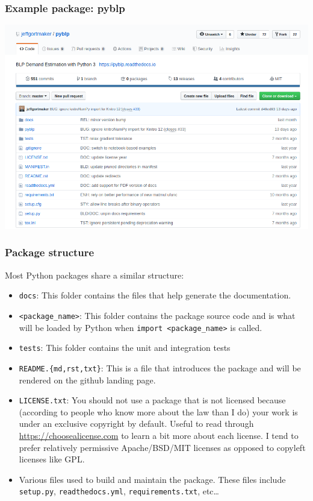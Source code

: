 \documentclass[10pt]{beamer}
\begin{document}
  \begin{frame} \frametitle{Example package: pyblp}

    \begin{center}
      \includegraphics[width=\textwidth]{pyblp_gh_snapshot.png}
    \end{center}


  \end{frame}

  \begin{frame} \frametitle{Package structure}

    {\footnotesize
    Most Python packages share a similar structure:

    \begin{itemize}
      \item \texttt{docs}: This folder contains the files that help generate the documentation.
      \item \texttt{<package\_name>}: This folder contains the package source code and is what will
        be loaded by Python when \texttt{import <package\_name>} is called.
      \item \texttt{tests}: This folder contains the unit and integration tests
      \item \texttt{README.\{md,rst,txt\}}: This is a file that introduces the package and will be
        rendered on the github landing page.
      \item \texttt{LICENSE.txt}: You should not use a package that is not licensed because
        (according to people who know more about the law than I do) your work is under an
        exclusive copyright by default. Useful to read through \url{https://choosealicense.com}
        to learn a bit more about each license. I tend to prefer relatively permissive Apache/BSD/MIT
        licenses as opposed to copyleft licenses like GPL.
      \item Various files used to build and maintain the package. These files include
        \texttt{setup.py}, \texttt{readthedocs.yml}, \texttt{requirements.txt}, etc\dots
    \end{itemize}

    }

  \end{frame}
\end{document}
